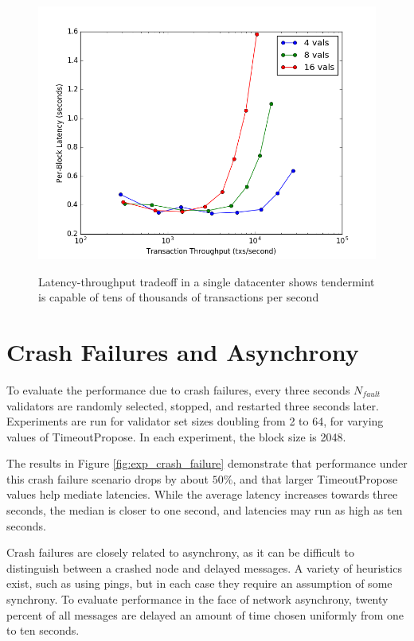\begin{figure}[]
	\includegraphics[width=\linewidth,height=\textheight,keepaspectratio]{figures/single_datacenter/latency-throughput.png}
    	\centering
	\label{fig:exp:single}
	\caption[Latency-throughput in non-faulty network, single data center]{Latency-throughput tradeoff in a single datacenter shows tendermint is capable of tens of thousands of transactions per second}
\end{figure}

\section{Crash Failures and Asynchrony}

To evaluate the performance due to crash failures, every three seconds $N_{fault}$ validators are randomly selected,
stopped, and restarted three seconds later.
Experiments are run for validator set sizes doubling from 2 to 64, for varying values of TimeoutPropose.
In each experiment, the block size is 2048.

The results in Figure \ref{fig:exp_crash_failure} demonstrate that performance under this crash failure scenario drops by about 
$50\%$, and that larger TimeoutPropose values help mediate latencies. While the average latency increases towards three seconds,
the median is closer to one second, and latencies may run as high as ten seconds.

Crash failures are closely related to asynchrony, as it can be difficult to distinguish between a crashed node
and delayed messages. A variety of heuristics exist, such as using pings, 
but in each case they require an assumption of some synchrony. 
To evaluate performance in the face of network asynchrony, twenty percent of all messages are delayed an amount of time chosen uniformly 
from one to ten seconds.


